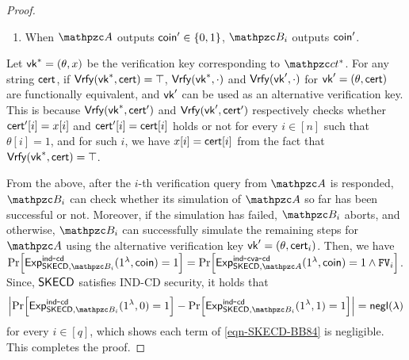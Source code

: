 \begin{proof}
\begin{enumerate}
\begin{description}
    \end{description}
    \item When $\qA$ outputs $\mathsf{coin}^\prime\in \{0,1\}$, $\qB_i$ outputs $\mathsf{coin}^\prime$.
\end{enumerate}

Let $\mathsf{vk}^*=(\theta,x)$ be the verification key corresponding to $\qct^*$. For any string $\mathsf{cert}$, if $\mathsf{Vrfy}(\mathsf{vk}^*,\mathsf{cert})=\top$, $\mathsf{Vrfy}(\mathsf{vk}^*,\cdot)$ and $\mathsf{Vrfy}(\mathsf{vk}^\prime,\cdot)$ for $\mathsf{vk}^\prime=(\theta,\mathsf{cert})$ are functionally equivalent, and $\mathsf{vk}^\prime$ can be used as an alternative verification key. This is because $\mathsf{Vrfy}(\mathsf{vk}^*,\mathsf{cert}^\prime)$ and $\mathsf{Vrfy}(\mathsf{vk}^\prime,\mathsf{cert}^\prime)$ respectively checks whether $\mathsf{cert}^\prime[i]=x[i]$ and $\mathsf{cert}^\prime[i]=\mathsf{cert}[i]$ holds or not for every $i\in[n]$ such that $\theta[i]=1$, and for such $i$, we have $x[i]=\mathsf{cert}[i]$ from the fact that $\mathsf{Vrfy}(\mathsf{vk}^*,\mathsf{cert})=\top$.

From the above, after the $i$-th verification query from $\qA$ is responded, $\qB_i$ can check whether its simulation of $\qA$ so far has been successful or not. Moreover, if the simulation has failed, $\qB_i$ aborts, and otherwise, $\qB_i$ can successfully simulate the remaining steps for $\qA$ using the alternative verification key $\mathsf{vk}^\prime=(\theta,\mathsf{cert}_i)$.
Then, we have $\Pr[\expb{\CDSKE,\qB_i}{ind}{cd}(1^\secp, \coin)=1]=\Pr[\expc{\CDSKE,\qA}{ind}{cva}{cd}(1^\secp, \coin)=1 \land \FV_i]$.
Since, $\mathsf{SKECD}$ satisfies IND-CD security, it holds that 
\[\abs{\Pr[\expb{\CDSKE,\qB_i}{ind}{cd}(1^\secp, 0)=1]-\Pr[\expb{\CDSKE,\qB_i}{ind}{cd}(1^\secp, 1)=1]}=\negl(\secp)\] for every $i\in[q]$, which shows each term of \cref{eqn-SKECD-BB84} is negligible.
This completes the proof.
\end{proof}
%
%
